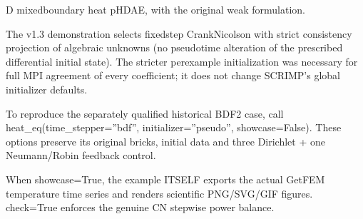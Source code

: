 \documentclass[letterpaper,10pt,english]{sphinxmanual}
\begin{document}
\begin{fulllineitems}
\label{\detokenize{examples/heat:examples.heat.heat_eq}}
\pysigstartsignatures
\pysiglinewithargsret
{}
{\sphinxparamcomma {}\sphinxparamcomma {}\sphinxparamcomma {}\sphinxparamcomma {}\sphinxparamcomma {}\sphinxparamcomma {}\sphinxparamcomma {}\sphinxparamcomma {}\sphinxparamcomma {}\sphinxparamcomma {}}
{}
\pysigstopsignatures
{}\sphinxhyphen{}D mixed\sphinxhyphen{}boundary heat pH\sphinxhyphen{}DAE, with the original weak formulation.

\sphinxAtStartPar
The v1.3 demonstration selects fixed\sphinxhyphen{}step Crank\textendash{}Nicolson with
strict consistency projection of algebraic unknowns (no pseudo\sphinxhyphen{}time
alteration of the prescribed differential initial state). The
stricter per\sphinxhyphen{}example initialization was necessary for full MPI
agreement of every coefficient; it does not change SCRIMP’s
global initializer defaults.

\sphinxAtStartPar
To reproduce the separately qualified historical BDF2 case, call
heat\_eq(time\_stepper=”bdf”, initializer=”pseudo”, showcase=False).
These options preserve its original bricks, initial data and
three Dirichlet + one Neumann/Robin feedback control.

\sphinxAtStartPar
When showcase=True, the example ITSELF exports the actual GetFEM
temperature time series and renders scientific PNG/SVG/GIF figures.
check=True enforces the genuine CN stepwise power balance.

\end{fulllineitems}
\end{document}
